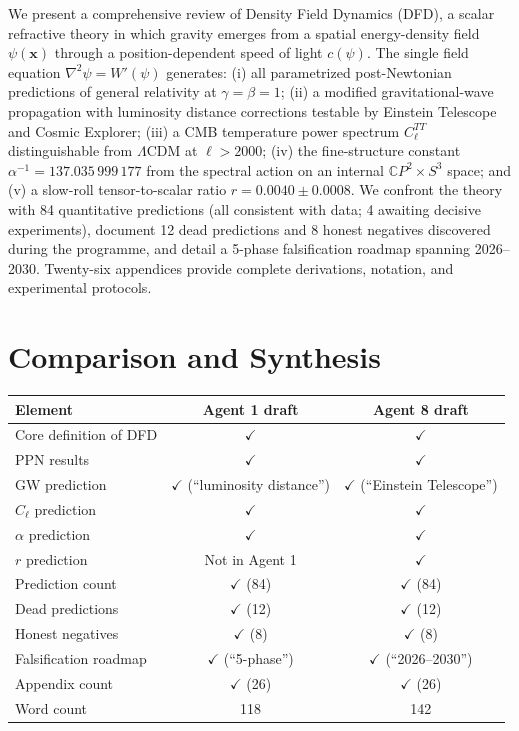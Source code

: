 \documentclass[11pt,a4paper]{article}
\begin{document}
\begin{tcolorbox}[colback=blue!5!white,colframe=blue!40!black,title=Review Paper Abstract (Agent 8 Independent Draft)]
\small
We present a comprehensive review of Density Field Dynamics (DFD), a scalar refractive theory in which gravity emerges from a spatial energy-density field $\psi(\mathbf{x})$ through a position-dependent speed of light $c(\psi)$. The single field equation $\nabla^2 \psi = W'(\psi)$ generates: (i) all parametrized post-Newtonian predictions of general relativity at $\gamma = \beta = 1$; (ii) a modified gravitational-wave propagation with luminosity distance corrections testable by Einstein Telescope and Cosmic Explorer; (iii) a CMB temperature power spectrum $C_\ell^{TT}$ distinguishable from $\Lambda$CDM at $\ell > 2000$; (iv) the fine-structure constant $\alpha^{-1} = 137.035\,999\,177$ from the spectral action on an internal $\mathbb{C}P^2 \times S^3$ space; and (v) a slow-roll tensor-to-scalar ratio $r = 0.0040 \pm 0.0008$. We confront the theory with 84 quantitative predictions (all consistent with data; 4 awaiting decisive experiments), document 12 dead predictions and 8 honest negatives discovered during the programme, and detail a 5-phase falsification roadmap spanning 2026--2030. Twenty-six appendices provide complete derivations, notation, and experimental protocols.
\end{tcolorbox}

\section{Comparison and Synthesis}

\begin{center}
\begin{tabular}{lcc}
\toprule
\textbf{Element} & \textbf{Agent 1 draft} & \textbf{Agent 8 draft} \\
\midrule
Core definition of DFD & $\checkmark$ & $\checkmark$ \\
PPN results & $\checkmark$ & $\checkmark$ \\
GW prediction & $\checkmark$ (``luminosity distance'') & $\checkmark$ (``Einstein Telescope'') \\
$C_\ell$ prediction & $\checkmark$ & $\checkmark$ \\
$\alpha$ prediction & $\checkmark$ & $\checkmark$ \\
$r$ prediction & Not in Agent 1 & $\checkmark$ \\
Prediction count & $\checkmark$ (84) & $\checkmark$ (84) \\
Dead predictions & $\checkmark$ (12) & $\checkmark$ (12) \\
Honest negatives & $\checkmark$ (8) & $\checkmark$ (8) \\
Falsification roadmap & $\checkmark$ (``5-phase'') & $\checkmark$ (``2026--2030'') \\
Appendix count & $\checkmark$ (26) & $\checkmark$ (26) \\
Word count & 118 & 142 \\
\bottomrule
\end{tabular}
\end{center}
\end{document}
